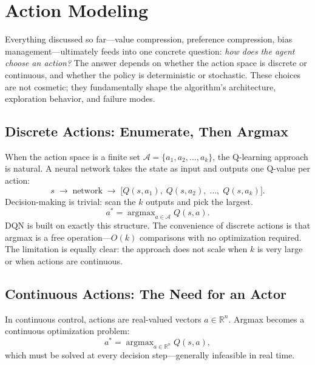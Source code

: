 \chapter{Action Modeling}
\label{ch:action-modeling}

Everything discussed so far---value compression, preference compression, bias
management---ultimately feeds into one concrete question: \emph{how does the
agent choose an action?}  The answer depends on whether the action space is
discrete or continuous, and whether the policy is deterministic or stochastic.
These choices are not cosmetic; they fundamentally shape the algorithm's
architecture, exploration behavior, and failure modes.


\section{Discrete Actions: Enumerate, Then Argmax}
\label{sec:discrete}

When the action space is a finite set $\mathcal{A} = \{a_1, a_2, \ldots, a_k\}$,
the Q-learning approach is natural.  A neural network takes the state as input
and outputs one Q-value per action:
\begin{equation}
  s \;\longrightarrow\; \text{network} \;\longrightarrow\;
  \bigl[Q(s,a_1),\; Q(s,a_2),\; \ldots,\; Q(s,a_k)\bigr].
\end{equation}
Decision-making is trivial: scan the $k$ outputs and pick the largest.
\begin{equation}
  a^{\ast} = \operatorname{argmax}_{a \in \mathcal{A}} Q(s,a).
\end{equation}
DQN is built on exactly this structure.  The convenience of discrete actions is
that argmax is a free operation---$O(k)$ comparisons with no optimization
required.  The limitation is equally clear: the approach does not scale when
$k$ is very large or when actions are continuous.


\section{Continuous Actions: The Need for an Actor}
\label{sec:continuous}

In continuous control, actions are real-valued vectors $a \in \mathbb{R}^n$.
Argmax becomes a continuous optimization problem:
\begin{equation}
  a^{\ast} = \operatorname{argmax}_{a \in \mathbb{R}^n} Q(s, a),
\end{equation}
which must be solved at every decision step---generally infeasible in real time.

